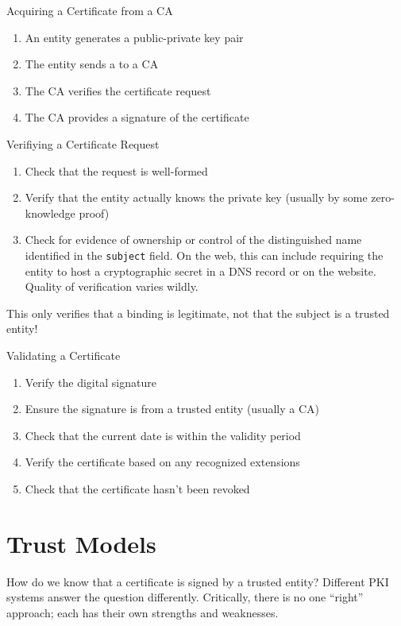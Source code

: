 \begin{tecbox}{Acquiring a Certificate from a CA}{}
    \begin{enumerate}
        \item An entity generates a public-private key pair
        \item The entity sends a  to a CA
        \item The CA verifies the certificate request
        \item The CA provides a signature of the certificate
    \end{enumerate}
\end{tecbox}

\begin{tecbox}{Verifiying a Certificate Request}{}
    \begin{enumerate}
        \item Check that the request is well-formed
        \item Verify that the entity actually knows the private key (usually by some zero-knowledge proof)
        \item Check for evidence of ownership or control of the distinguished name identified in the \texttt{subject} field. On the web, this can include requiring the entity to host a cryptographic secret in a DNS record or on the website. Quality of verification varies wildly.
    \end{enumerate}
\end{tecbox}

This only verifies that a binding is legitimate, not that the subject is a trusted entity!

\begin{tecbox}{Validating a Certificate}{}
    \begin{enumerate}
        \item Verify the digital signature
        \item Ensure the signature is from a trusted entity (usually a CA)
        \item Check that the current date is within the validity period
        \item Verify the certificate based on any recognized extensions
        \item Check that the certificate hasn't been revoked
    \end{enumerate}
\end{tecbox}

\section{Trust Models}
How do we know that a certificate is signed by a trusted entity? Different PKI systems answer the question differently. Critically, there is no one ``right'' approach; each has their own strengths and weaknesses.


